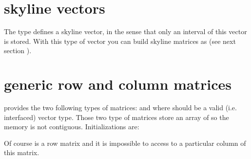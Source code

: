 \documentclass[a4paper,11pt,english]{sphinxmanual}
\begin{document}
\section{skyline vectors}
\label{\detokenize{gmm/matrix:skyline-vectors}}
The type  defines a skyline vector, in the sense that only an interval of this vector is stored. With this type of vector you can build skyline matrices as  (see next section {\hyperref[\detokenize{gmm/matrix:gmmracmat}]{}}).


\section{generic row and column matrices}
\label{\detokenize{gmm/matrix:generic-row-and-column-matrices}}\label{\detokenize{gmm/matrix:gmmracmat}}
 provides the two following types of matrices:  and  where  should be a valid (i.e. interfaced) vector type.
Those two type of matrices store an array of  so the memory is not contiguous. Initializations are:

\begin{sphinxVerbatim}[commandchars=\\\{\}]
      
     
\end{sphinxVerbatim}

Of course  is a row matrix and it is impossible to access to a particular column of this matrix.
\end{document}

